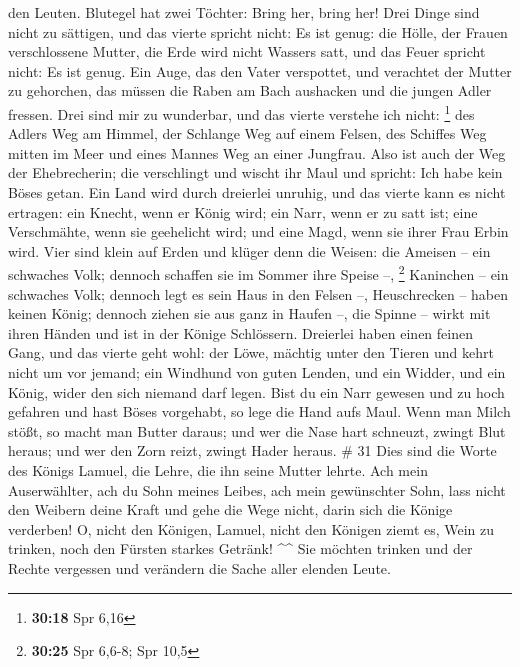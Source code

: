 den Leuten.  Blutegel hat zwei Töchter: Bring her, bring
her! Drei Dinge sind nicht zu sättigen, und das vierte spricht nicht: Es
ist genug:  die Hölle, der Frauen verschlossene Mutter, die
Erde wird nicht Wassers satt, und das Feuer spricht nicht: Es ist genug.
 Ein Auge, das den Vater verspottet, und verachtet der
Mutter zu gehorchen, das müssen die Raben am Bach aushacken und die
jungen Adler fressen.  Drei sind mir zu wunderbar, und das
vierte verstehe ich nicht: \footnote{\textbf{30:18} Spr 6,16}
 des Adlers Weg am Himmel, der Schlange Weg auf einem
Felsen, des Schiffes Weg mitten im Meer und eines Mannes Weg an einer
Jungfrau.  Also ist auch der Weg der Ehebrecherin; die
verschlingt und wischt ihr Maul und spricht: Ich habe kein Böses getan.
 Ein Land wird durch dreierlei unruhig, und das vierte kann
es nicht ertragen:  ein Knecht, wenn er König wird; ein
Narr, wenn er zu satt ist;  eine Verschmähte, wenn sie
geehelicht wird; und eine Magd, wenn sie ihrer Frau Erbin wird.
 Vier sind klein auf Erden und klüger denn die Weisen:
 die Ameisen -- ein schwaches Volk; dennoch schaffen sie im
Sommer ihre Speise --, \footnote{\textbf{30:25} Spr 6,6-8; Spr 10,5}
 Kaninchen -- ein schwaches Volk; dennoch legt es sein Haus
in den Felsen --,  Heuschrecken -- haben keinen König;
dennoch ziehen sie aus ganz in Haufen --,  die Spinne --
wirkt mit ihren Händen und ist in der Könige Schlössern. 
Dreierlei haben einen feinen Gang, und das vierte geht wohl:
 der Löwe, mächtig unter den Tieren und kehrt nicht um vor
jemand;  ein Windhund von guten Lenden, und ein Widder, und
ein König, wider den sich niemand darf legen.  Bist du ein
Narr gewesen und zu hoch gefahren und hast Böses vorgehabt, so lege die
Hand aufs Maul.  Wenn man Milch stößt, so macht man Butter
daraus; und wer die Nase hart schneuzt, zwingt Blut heraus; und wer den
Zorn reizt, zwingt Hader heraus. \# 31  Dies sind die Worte
des Königs Lamuel, die Lehre, die ihn seine Mutter lehrte. 
Ach mein Auserwählter, ach du Sohn meines Leibes, ach mein gewünschter
Sohn,  lass nicht den Weibern deine Kraft und gehe die Wege
nicht, darin sich die Könige verderben!  O, nicht den
Königen, Lamuel, nicht den Königen ziemt es, Wein zu trinken, noch den
Fürsten starkes Getränk! \^{}\^{}  Sie möchten trinken und
der Rechte vergessen und verändern die Sache aller elenden Leute.
